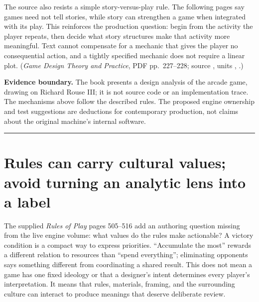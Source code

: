 The source also resists a simple story-versus-play rule. The following pages say games need not tell stories, while story can strengthen a game when integrated with its play. This reinforces the production question: begin from the activity the player repeats, then decide what story structures make that activity more meaningful. Text cannot compensate for a mechanic that gives the player no consequential action, and a tightly specified mechanic does not require a linear plot. (\emph{Game Design Theory and Practice}, PDF pp.~227--228; source , units , .)

\textbf{Evidence boundary.} The book presents a design analysis of the arcade game, drawing on Richard Rouse III; it is not source code or an implementation trace. The mechanisms above follow the described rules. The proposed engine ownership and test suggestions are deductions for contemporary production, not claims about the original machine's internal software.

\begin{center}\rule{0.5\linewidth}{0.5pt}\end{center}

\section{Rules can carry cultural values; avoid turning an analytic lens into a label}\label{06-engine-ii-ch046-rules-can-carry-cultural-values-avoid-turning-an-analytic-lens-into-a-label}

\hypertarget{06-engine-ii-ch046-rules-can-carry-cultural-values-avoid-turning-an-analytic-lens-into-a-label}{}

The supplied \emph{Rules of Play} pages 505--516 add an authoring question missing from the live engine volume: what values do the rules make actionable? A victory condition is a compact way to express priorities. ``Accumulate the most'' rewards a different relation to resources than ``spend everything''; eliminating opponents says something different from coordinating a shared result. This does not mean a game has one fixed ideology or that a designer's intent determines every player's interpretation. It means that rules, materials, framing, and the surrounding culture can interact to produce meanings that deserve deliberate review.

